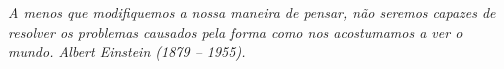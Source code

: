 \renewcommand{\epigraphname}{EPÍGRAFE}

\begin{epigrafe}[EPÍGRAFE]

\textit{A menos que modifiquemos a nossa maneira de pensar, não seremos capazes de resolver os problemas causados pela forma como nos acostumamos a ver o mundo. Albert Einstein (1879 -- 1955).}

\end{epigrafe}

